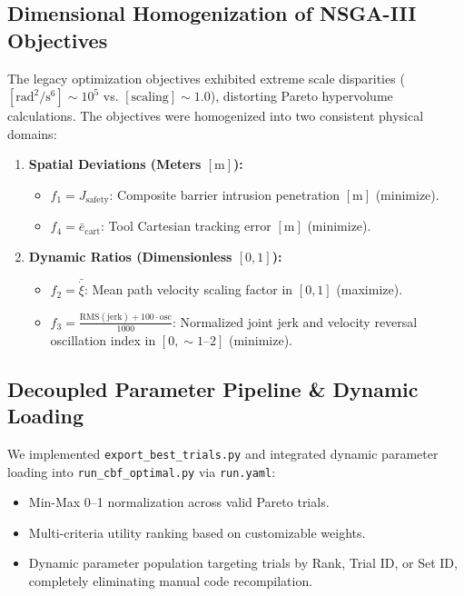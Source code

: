 \documentclass[10pt,twocolumn,a4paper]{article}
\begin{document}
\subsection{Dimensional Homogenization of NSGA-III Objectives}
The legacy optimization objectives exhibited extreme scale disparities ($[\text{rad}^2/\text{s}^6] \sim 10^5$ vs. $[\text{scaling}] \sim 1.0$), distorting Pareto hypervolume calculations. The objectives were homogenized into two consistent physical domains:
\begin{enumerate}
    \item \textbf{Spatial Deviations (Meters $[\text{m}]$):}
    \begin{itemize}
        \item $f_1 = J_{\text{safety}}$: Composite barrier intrusion penetration $[\text{m}]$ (minimize).
        \item $f_4 = \bar{e}_{\text{cart}}$: Tool Cartesian tracking error $[\text{m}]$ (minimize).
    \end{itemize}
    \item \textbf{Dynamic Ratios (Dimensionless $[0, 1]$):}
    \begin{itemize}
        \item $f_2 = \bar{\dot{\xi}}$: Mean path velocity scaling factor in $[0, 1]$ (maximize).
        \item $f_3 = \frac{\text{RMS}(\text{jerk}) + 100 \cdot \text{osc}}{1000}$: Normalized joint jerk and velocity reversal oscillation index in $[0, \sim 1\text{--}2]$ (minimize).
    \end{itemize}
\end{enumerate}

\subsection{Decoupled Parameter Pipeline \& Dynamic Loading}
We implemented \texttt{export\_best\_trials.py} and integrated dynamic parameter loading into \texttt{run\_cbf\_optimal.py} via \texttt{run.yaml}:
\begin{itemize}
    \item Min-Max 0--1 normalization across valid Pareto trials.
    \item Multi-criteria utility ranking based on customizable weights.
    \item Dynamic parameter population targeting trials by Rank, Trial ID, or Set ID, completely eliminating manual code recompilation.
\end{itemize}
\end{document}
